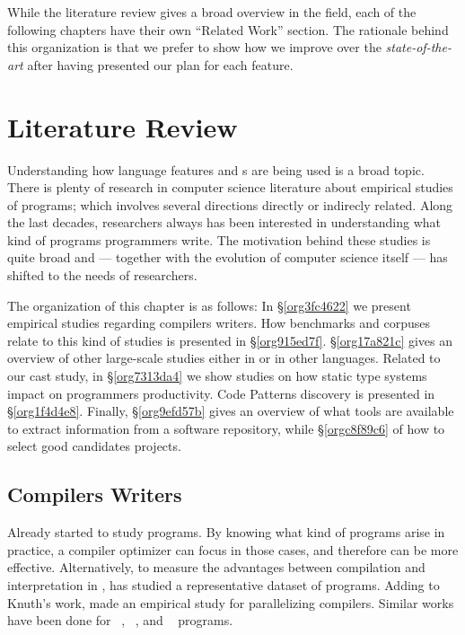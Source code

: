 \documentclass{usiinfdocprop}
\begin{document}
While the literature review gives a broad overview in the field, each of the following chapters have their own ``Related Work'' section. 
The rationale behind this organization is that we prefer to show how we improve over the \emph{state-of-the-art} after having presented our plan for each feature.

\chapter{Literature Review \label{org1823abf}}
\label{sec:org07d47a6}
Understanding how language features and \api{}s are being used is a broad topic.
There is plenty of research in computer science literature about empirical studies of programs; which involves several directions directly or indirecly related.
Along the last decades, researchers always has been interested in understanding what kind of programs programmers write.
The motivation behind these studies is quite broad and --- together with the evolution of computer science itself --- has shifted to the needs of researchers.

The organization of this chapter is as follows:
In \S\ref{org3fc4622} we present empirical studies regarding compilers writers.
How benchmarks and corpuses relate to this kind of studies is presented in \S\ref{org915ed7f}.
\S\ref{org17a821c} gives an overview of other large-scale studies either in \java{} or in other languages.
Related to our cast study, in \S\ref{org7313da4} we show studies on how static type systems impact on programmers productivity.
Code Patterns discovery is presented in \S\ref{org1f4d4e8}.
Finally, \S\ref{org9efd57b} gives an overview of what tools are available to extract information from a software repository, while \S\ref{orgc8f89c6} of how to select good candidates projects.

\section{Compilers Writers \label{org3fc4622}}
\label{sec:org8aae3f1}

Already \cite{knuth_empirical_1971} started to study \fortran{} programs.
By knowing what kind of programs arise in practice, a compiler optimizer can focus in those cases, and therefore can be more effective.
Alternatively, to measure the advantages between compilation and interpretation in \basic{}, \cite{hammond_basic_1977} has studied a representative dataset of programs.
Adding to Knuth's work, \cite{shen_empirical_1990} made an empirical study for parallelizing compilers.
Similar works have been done for \cobol{}~\cite{salvadori_static_1975,chevance_static_1978}, \pascal{}~\cite{cook_contextual_1982}, and \apl{}~\cite{saal_properties_1975,saal_empirical_1977} programs.
\end{document}
